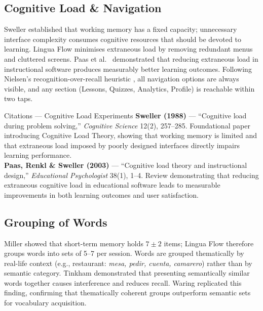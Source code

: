 \documentclass[10pt,a4paper]{article}
\begin{document}
\subsection{Cognitive Load \& Navigation}
Sweller \cite{sweller1988cognitive} established that working memory has a fixed capacity; unnecessary interface complexity consumes cognitive resources that should be devoted to learning. Lingua Flow minimises extraneous load by removing redundant menus and cluttered screens. Paas et al.\ \cite{paas2003cognitive} demonstrated that reducing extraneous load in instructional software produces measurably better learning outcomes. Following Nielsen's recognition-over-recall heuristic \cite{nielsen1994usability}, all navigation options are always visible, and any section (Lessons, Quizzes, Analytics, Profile) is reachable within two taps.

\begin{citationbox}{Citations --- Cognitive Load Experiments}
\textbf{Sweller (1988)} --- ``Cognitive load during problem solving,'' \emph{Cognitive Science} 12(2), 257--285. Foundational paper introducing Cognitive Load Theory, showing that working memory is limited and that extraneous load imposed by poorly designed interfaces directly impairs learning performance.\\[3pt]
\textbf{Paas, Renkl \& Sweller (2003)} --- ``Cognitive load theory and instructional design,'' \emph{Educational Psychologist} 38(1), 1--4. Review demonstrating that reducing extraneous cognitive load in educational software leads to measurable improvements in both learning outcomes and user satisfaction.
\end{citationbox}

\subsection{Grouping of Words}
Miller \cite{miller1956magical} showed that short-term memory holds $7 \pm 2$ items; Lingua Flow therefore groups words into sets of 5--7 per session. Words are grouped thematically by real-life context (e.g., restaurant: \textit{mesa, pedir, cuenta, camarero}) rather than by semantic category. Tinkham \cite{tinkham1997effects} demonstrated that presenting semantically similar words together causes interference and reduces recall. Waring \cite{waring1997unhelpfulness} replicated this finding, confirming that thematically coherent groups outperform semantic sets for vocabulary acquisition.
\end{document}
